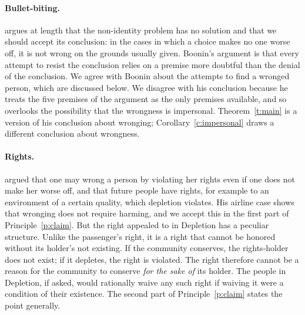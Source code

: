 \documentclass{situationist-preprint}
\begin{document}
\paragraph{Bullet-biting.} \citet{Boonin2014} argues at length that the non-identity problem has no solution and that we should accept its conclusion: in the cases in which a choice makes no one worse off, it is not wrong on the grounds usually given. Boonin's argument is that every attempt to resist the conclusion relies on a premise more doubtful than the denial of the conclusion. We agree with Boonin about the attempts to find a wronged person, which are discussed below. We disagree with his conclusion because he treats the five premises of the argument as the only premises available, and so overlooks the possibility that the wrongness is impersonal. Theorem~\ref{t:main} is a version of his conclusion about wronging; Corollary~\ref{c:impersonal} draws a different conclusion about wrongness.

\paragraph{Rights.} \citet{Woodward1986} argued that one may wrong a person by violating her rights even if one does not make her worse off, and that future people have rights, for example to an environment of a certain quality, which depletion violates. His airline case shows that wronging does not require harming, and we accept this in the first part of Principle~\ref{p:claim}. But the right appealed to in Depletion has a peculiar structure. Unlike the passenger's right, it is a right that cannot be honored without its holder's not existing. If the community conserves, the rights-holder does not exist; if it depletes, the right is violated. The right therefore cannot be a reason for the community to conserve \emph{for the sake of} its holder. The people in Depletion, if asked, would rationally waive any such right if waiving it were a condition of their existence. The second part of Principle~\ref{p:claim} states the point generally.
\end{document}
